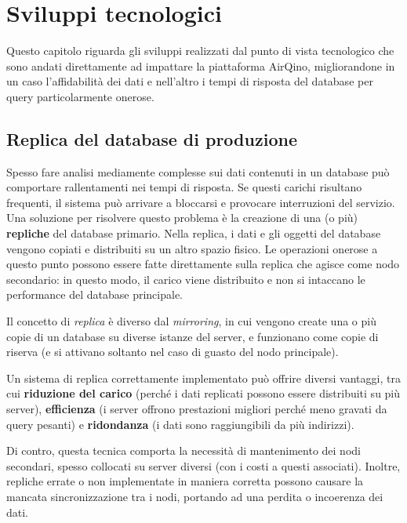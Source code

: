\chapter{Sviluppi tecnologici}\label{ch:sviluppi}
Questo capitolo riguarda gli sviluppi realizzati dal punto di vista tecnologico che sono andati direttamente ad impattare la piattaforma AirQino, migliorandone in un caso l'affidabilità dei dati e nell'altro i tempi di risposta del database per query particolarmente onerose.

\section{Replica del database di produzione}\label{sec:replica}

Spesso fare analisi mediamente complesse sui dati contenuti in un database può comportare rallentamenti nei tempi di risposta. Se questi carichi risultano frequenti, il sistema può arrivare a bloccarsi e provocare interruzioni del servizio. Una soluzione per risolvere questo problema è la creazione di una (o più) \textbf{repliche} del database primario. Nella replica, i dati e gli oggetti del database vengono copiati e distribuiti su un altro spazio fisico. Le operazioni onerose a questo punto possono essere fatte direttamente sulla replica che agisce come nodo secondario: in questo modo, il carico viene distribuito e non si intaccano le performance del database principale.

Il concetto di \textit{replica} è diverso dal \textit{mirroring}, in cui vengono create una o più copie di un database su diverse istanze del server, e funzionano come copie di riserva (e si attivano soltanto nel caso di guasto del nodo principale).

Un sistema di replica correttamente implementato può offrire diversi vantaggi, tra cui \textbf{riduzione del carico} (perché i dati replicati possono essere distribuiti su più server), \textbf{efficienza} (i server offrono prestazioni migliori perché meno gravati da query pesanti) e \textbf{ridondanza} (i dati sono raggiungibili da più indirizzi).

Di contro, questa tecnica comporta la necessità di mantenimento dei nodi secondari, spesso collocati su server diversi (con i costi a questi associati). Inoltre, repliche errate o non implementate in maniera corretta possono causare la mancata sincronizzazione tra i nodi, portando ad una perdita o incoerenza dei dati.

